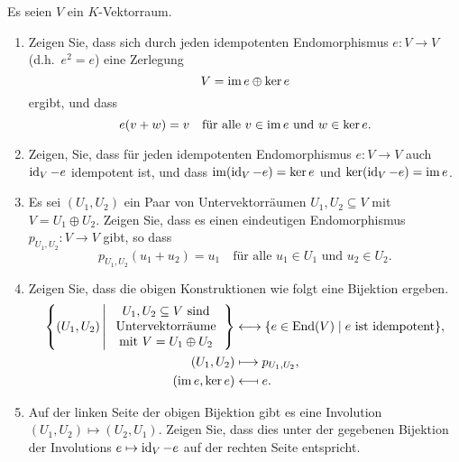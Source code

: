 

\begin{question}[subtitle = Äquivalenz von Idempotenten und direkten Summen]{3}
  Es seien $V$ ein $K$-Vektorraum.
  \begin{enumerate}[leftmargin=*]
    \item
      Zeigen Sie, dass sich durch jeden idempotenten Endomorphismus $e \colon V \to V$ (d.h.\ $e^2 = e$) eine Zerlegung
      \[
        V = \operatorname{im} e \oplus \ker e
      \]
      ergibt, und dass
      \[
        e(v + w) = v
        \quad
        \text{für alle $v \in \operatorname{im} e$ und $w \in \ker e$}.
      \]
    \item
      Zeigen, Sie, dass für jeden idempotenten Endomorphismus $e \colon V \to V$ auch $\operatorname{id}_V - e$ idempotent ist, und dass $\operatorname{im} (\operatorname{id}_V - e) = \ker e$ und $\ker (\operatorname{id}_V - e) = \operatorname{im} e$.
    \item
      Es sei $(U_1, U_2)$ ein Paar von Untervektorräumen $U_1, U_2 \subseteq V$ mit $V = U_1 \oplus U_2$.
      Zeigen Sie, dass es einen eindeutigen Endomorphismus $p_{U_1, U_2} \colon V \to V$ gibt, so dass
      \[
          p_{U_1, U_2}(u_1 + u_2)
        = u_1
        \quad
        \text{für alle $u_1 \in U_1$ und $u_2 \in U_2$}.
      \]
    \item
      Zeigen Sie, dass die obigen Konstruktionen wie folgt eine Bijektion ergeben.
      \begin{align*}
        \left\{
          (U_1, U_2)
          \,\middle|\,
          \begin{tabular}{c}
            $U_1, U_2 \subseteq V$ sind \\
            Untervektorräume            \\
            mit $V = U_1 \oplus U_2$
          \end{tabular}
        \right\}
        &\longleftrightarrow
        \{ e \in \End(V) \mid \text{$e$ ist idempotent} \},
      \\
        (U_1, U_2) &\longmapsto p_{U_1, U_2},
      \\
        (\im e, \ker e) &\longmapsfrom e.
      \end{align*}
    \item
      Auf der linken Seite der obigen Bijektion gibt es eine Involution $(U_1, U_2) \mapsto (U_2, U_1)$.
      Zeigen Sie, dass dies unter der gegebenen Bijektion der Involutions $e \mapsto \operatorname{id}_V - e$ auf der rechten Seite entspricht.
  \end{enumerate}
\end{question}


